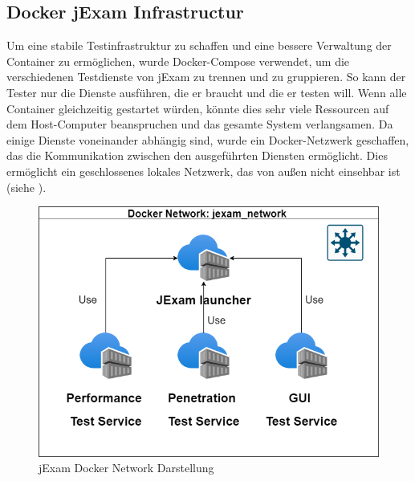 \subsection{Docker jExam Infrastructur}
Um eine stabile Testinfrastruktur zu schaffen und eine bessere
Verwaltung der Container zu ermöglichen, wurde Docker-Compose
verwendet, um die verschiedenen Testdienste von jExam zu trennen
und zu gruppieren. So kann der Tester nur die Dienste ausführen,
die er braucht und die er testen will. Wenn alle Container
gleichzeitig gestartet würden, könnte dies sehr viele Ressourcen auf
dem Host-Computer beanspruchen und das gesamte System verlangsamen.
Da einige Dienste voneinander abhängig sind, wurde ein Docker-Netzwerk
geschaffen, das die Kommunikation zwischen den ausgeführten Diensten
ermöglicht. Dies ermöglicht ein geschlossenes lokales Netzwerk, das
von außen nicht einsehbar ist (siehe ).

\begin{figure}[H]
    \centering
    \includegraphics[scale=0.6]{images/all.drawio}
    \caption{jExam Docker Network Darstellung} \label{fig:dock-net}
\end{figure}






